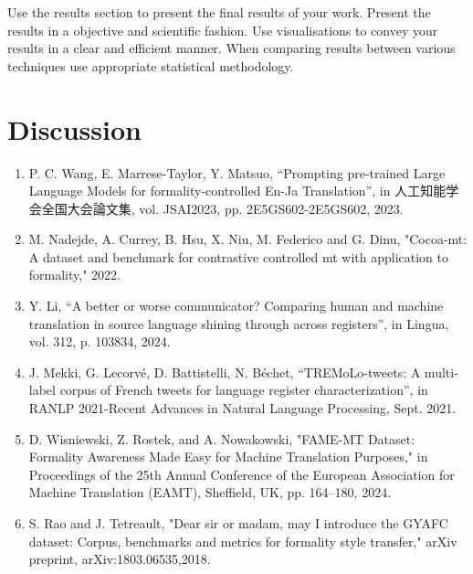 \documentclass[fleqn,moreauthors,10pt]{ds_report}
\begin{document}
		Use the results section to present the final results of your work. Present the results in a objective and scientific fashion. Use visualisations to convey your results in a clear and efficient manner. When comparing results between various techniques use appropriate statistical methodology.

		
		
		
		
		
		\section*{Discussion}
		
		

		
		
		
		
		
		
		\renewcommand{\labelenumi}{[\theenumi]}
		\begin{enumerate}
			\item  P. C. Wang, E. Marrese-Taylor, Y. Matsuo, “Prompting pre-trained Large Language Models for formality-controlled En-Ja Translation”, in 人工知能学会全国大会論文集, vol. JSAI2023, pp. 2E5GS602-2E5GS602, 2023.
			\item M. Nadejde, A. Currey, B. Hsu, X. Niu, M. Federico and G. Dinu, "Cocoa-mt: A dataset and benchmark for contrastive controlled mt with application to formality," 2022.
			\item Y. Li, “A better or worse communicator? Comparing human and machine translation in source language shining through across registers”, in Lingua, vol. 312, p. 103834, 2024.
			\item J. Mekki, G. Lecorvé, D. Battistelli, N. Béchet, “TREMoLo-tweets: A multi-label corpus of French tweets for language register characterization”, in RANLP 2021-Recent Advances in Natural Language Processing, Sept. 2021.
			\item D. Wisniewski, Z. Rostek, and A. Nowakowski, "FAME-MT Dataset: Formality Awareness Made Easy for Machine Translation Purposes," in Proceedings of the 25th Annual Conference of the European Association for Machine Translation (EAMT), Sheffield, UK, pp. 164–180, 2024.
			\item S. Rao and J. Tetreault, "Dear sir or madam, may I introduce the GYAFC dataset: Corpus, benchmarks and metrics for formality style transfer," arXiv preprint, arXiv:1803.06535,2018.
		\end{enumerate}
		
		
	
\end{document}
